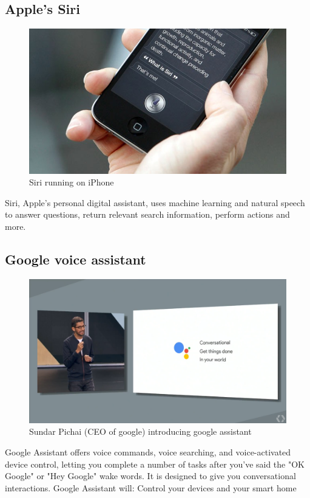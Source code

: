 \documentclass[11pt]{article}
\begin{document}
\subsection{Apple's Siri}
\label{sec:orgd365147}
\begin{figure}[htbp]
\centering
\includegraphics[width=.9\linewidth]{./img/siri.png}
\caption{\label{fig:org20cece8}Siri running on iPhone}
\end{figure}
Siri, Apple's personal digital assistant, uses machine learning and natural speech
to answer questions, return relevant search information, perform actions and more.

\subsection{Google voice assistant}
\label{sec:orgfe194db}
\begin{figure}[htbp]
\centering
\includegraphics[width=.9\linewidth]{./img/google-assistant.png}
\caption{\label{fig:orgb59cc5e}Sundar Pichai (CEO of google) introducing google assistant}
\end{figure}
Google Assistant offers voice commands, voice searching, and voice-activated
device control, letting you complete a number of tasks after you've said the
"OK Google" or "Hey Google" wake words. It is designed to give you conversational
interactions. Google Assistant will: Control your devices and your smart home
\clearpage
\end{document}
